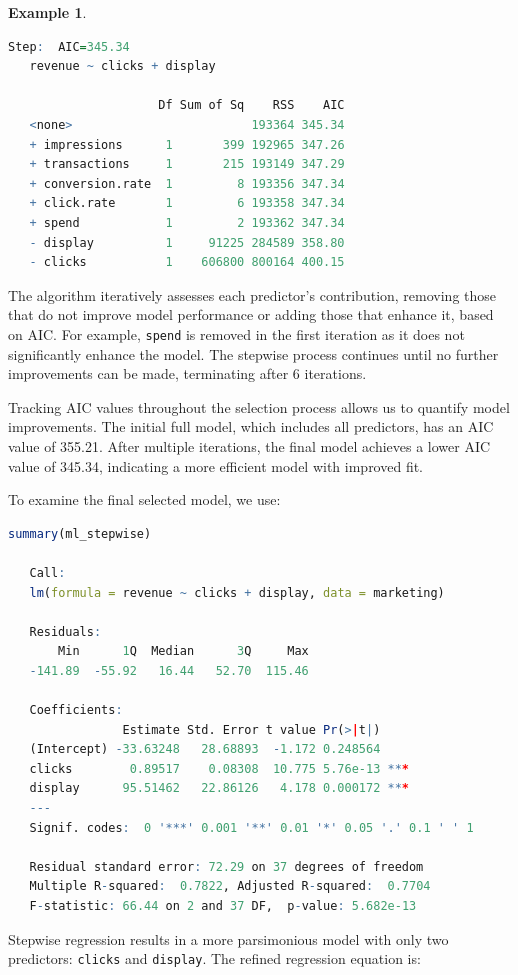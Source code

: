\documentclass[
  11pt,
]{book}
\newcommand{\passthrough}[1]{#1}
\theoremstyle{definition}
\theoremstyle{definition}
\newtheorem{example}{Example}[chapter]
\theoremstyle{definition}
\theoremstyle{definition}
\theoremstyle{remark}
\begin{document}
\begin{example}
\begin{lstlisting}[language=R]
   Step:  AIC=345.34
   revenue ~ clicks + display
   
                     Df Sum of Sq    RSS    AIC
   <none>                         193364 345.34
   + impressions      1       399 192965 347.26
   + transactions     1       215 193149 347.29
   + conversion.rate  1         8 193356 347.34
   + click.rate       1         6 193358 347.34
   + spend            1         2 193362 347.34
   - display          1     91225 284589 358.80
   - clicks           1    606800 800164 400.15
\end{lstlisting}

The algorithm iteratively assesses each predictor's contribution, removing those that do not improve model performance or adding those that enhance it, based on AIC. For example, \passthrough{\lstinline!spend!} is removed in the first iteration as it does not significantly enhance the model. The stepwise process continues until no further improvements can be made, terminating after 6 iterations.

Tracking AIC values throughout the selection process allows us to quantify model improvements. The initial full model, which includes all predictors, has an AIC value of 355.21. After multiple iterations, the final model achieves a lower AIC value of 345.34, indicating a more efficient model with improved fit.

To examine the final selected model, we use:

\begin{lstlisting}[language=R]
summary(ml_stepwise)
   
   Call:
   lm(formula = revenue ~ clicks + display, data = marketing)
   
   Residuals:
       Min      1Q  Median      3Q     Max 
   -141.89  -55.92   16.44   52.70  115.46 
   
   Coefficients:
                Estimate Std. Error t value Pr(>|t|)    
   (Intercept) -33.63248   28.68893  -1.172 0.248564    
   clicks        0.89517    0.08308  10.775 5.76e-13 ***
   display      95.51462   22.86126   4.178 0.000172 ***
   ---
   Signif. codes:  0 '***' 0.001 '**' 0.01 '*' 0.05 '.' 0.1 ' ' 1
   
   Residual standard error: 72.29 on 37 degrees of freedom
   Multiple R-squared:  0.7822, Adjusted R-squared:  0.7704 
   F-statistic: 66.44 on 2 and 37 DF,  p-value: 5.682e-13
\end{lstlisting}

Stepwise regression results in a more parsimonious model with only two predictors: \passthrough{\lstinline!clicks!} and \passthrough{\lstinline!display!}. The refined regression equation is:


\end{example}
\end{document}
